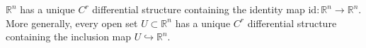 $\mathbb{R}^n$ has a unique $C^r$ differential structure containing the identity map $\mathrm{id}: \mathbb{R}^n \to \mathbb{R}^n$. More generally, every open set $U \subset \mathbb{R}^n$ has a unique $C^r$ differential structure containing the inclusion map $U \hookrightarrow \mathbb{R}^n$.
